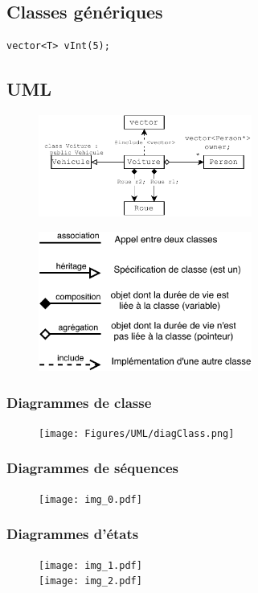 \subsection{Classes génériques}
\begin{lstlisting}[style=Cpp]
vector<T> vInt(5);
\end{lstlisting}
%
\subsection{UML}
\begin{figure}[H]
    \centering
    \includegraphics[width=7cm]{figures/UML_car.pdf}
\end{figure}
\begin{figure}[H]
    \centering
    \includegraphics[width=7cm]{figures/UML_class_arrow.pdf}
\end{figure}
%
\subsubsection{Diagrammes de classe}
\begin{figure}[H]
    \centering
    \texttt{[image: Figures/UML/diagClass.png]}
\end{figure}

\subsubsection{Diagrammes de séquences}
\begin{figure}[H]
    \centering
    \texttt{[image: img\_0.pdf]}
\end{figure}
%
\subsubsection{Diagrammes d'états}
\begin{figure}[H]
    \centering
    \texttt{[image: img\_1.pdf]}\\
    \texttt{[image: img\_2.pdf]}
\end{figure}
